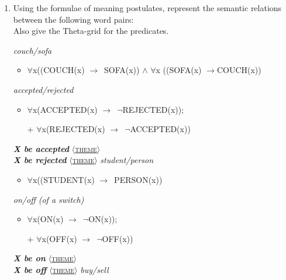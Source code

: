 \documentclass[a4paper]{article}
\newcommand{\lex}[1]{\textbf{\textit{#1}}}
\newcommand{\ul}{\uline}
\newcommand{\into}{\ensuremath{\rightarrow}}
\newcommand{\tr}[1]{\textsc{#1}}
\newcommand{\grid}[1]{\ensuremath{\langle}\tr{#1}{\ensuremath{\rangle}}}
\begin{document}
\begin{enumerate}
\begin{exe}
  \end{exe}
\item Using the formulae of meaning postulates, represent the
  semantic relations between the following word pairs:
  \\  Also give the Theta-grid for the predicates.
  \begin{exe}
    \ex \textit{couch/sofa}
    \begin{itemize}
    \item $\forall$x((COUCH(x) \into\ SOFA(x)) $\wedge$ 
      $\forall$x ((SOFA(x) \into COUCH(x))
    \end{itemize}
    \ex \textit{accepted/rejected}
    \begin{itemize}
    \item $\forall$x(ACCEPTED(x) \into\ $\neg$REJECTED(x));
    \item[+] $\forall$x(REJECTED(x) \into\ $\neg$ACCEPTED(x))
    \end{itemize}
        \lex{X be accepted} \grid{\ul{theme}}
  \\  \lex{X be rejected} \grid{\ul{theme}}
    \ex \textit{student/person}
    \begin{itemize}
    \item $\forall$x((STUDENT(x) \into\ PERSON(x))
    \end{itemize}

    \ex \textit{on/off (of a switch)}
    \begin{itemize}
    \item $\forall$x(ON(x) \into\ $\neg$ON(x));
    \item[+] $\forall$x(OFF(x) \into\ $\neg$OFF(x))
    \end{itemize}
     \lex{X be on} \grid{\ul{theme}}
  \\  \lex{X be off} \grid{\ul{theme}}
    \ex \textit{buy/sell}


\end{exe}
\end{enumerate}
\end{document}
